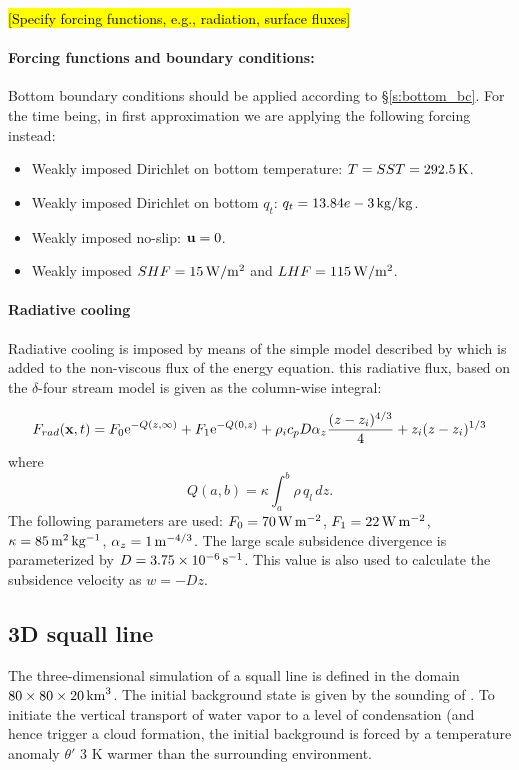 \documentclass{article}
\begin{document}
{\hl{[Specify forcing functions, e.g., radiation, surface fluxes]}
\paragraph{Forcing functions and boundary conditions:}

Bottom boundary conditions should be applied according to \S \ref{s:bottom_bc}. For the time being, in first approximation we are applying the following forcing instead:

\begin{itemize}
    \item Weakly imposed Dirichlet on bottom temperature: $T=SST=292.5\,{\rm K}$.
    \item Weakly imposed Dirichlet on bottom $q_t$: $q_t=13.84e-3\,{\rm kg/kg}$.
    \item Weakly imposed no-slip: ${\bf u}= 0$.
    \item Weakly imposed $SHF = 15\,{\rm W/m^2}$ and $LHF = 115\,{\rm W/m^2}$.
\end{itemize}

\paragraph{Radiative cooling}
Radiative cooling is imposed by means of the simple model described by \cite{Stevens05a} which is added to the non-viscous flux of the energy equation. this radiative flux, based on the $\delta$-four stream model \citep{fuLiu1993} is given as the column-wise integral:

\begin{equation}
    \label{e:radiativeStevens05}
    F_{rad}({\bf x}, t) = F_0{\rm e}^{-Q(z,\infty)} +
    F_1{\rm e}^{-Q(0, z)} +
    \rho_i c_p D \alpha_z\frac{(z-z_i)^{4/3}}{4} + z_i(z - z_i)^{1/3}
\end{equation}
where 
\begin{equation}
    Q(a,b) = \kappa\int_{a}^{b}\rho\,q_l\,dz.
\end{equation}
The following parameters are used:
$F_0=70\,{\rm W\,m^{-2}}$, $F_1=22\,{\rm W\,m^{-2}}$, $\kappa=85\,{\rm m^2\,kg^{-1}}$, $\alpha_z=1\,{\rm m^{-4/3}}$. The large scale subsidence divergence is parameterized by $D=3.75\times 10^{-6}\,{\rm s^{-1}}$. This value is also used to calculate the subsidence velocity as $w=-Dz$.


\subsection{3D squall line}
\label{sq3D}
The three-dimensional simulation of a squall line is defined in the domain 
$80\times 80\times20\,{\rm km}^3$. 
The initial background state is given by the sounding of \cite{gabersekGiraldoDoyle2012}.
To initiate the vertical transport of water vapor to a level of condensation (and hence trigger a cloud formation, the initial background is forced by a temperature anomaly $\theta'$ $3$ K warmer than the surrounding environment. 

}
\end{document}
